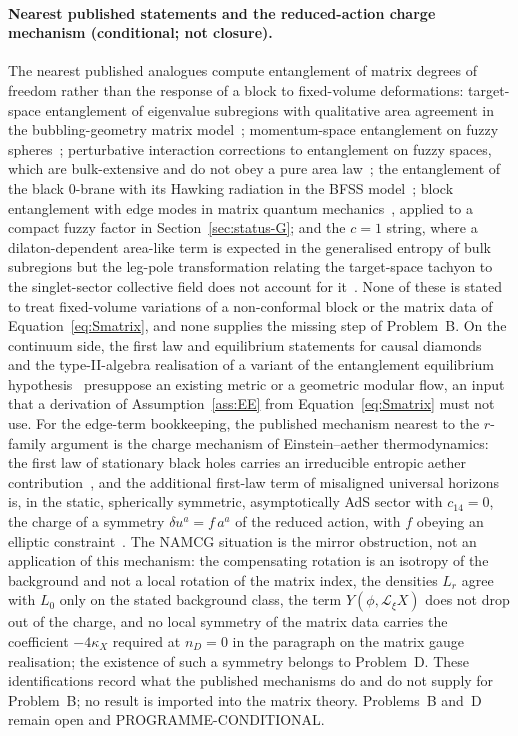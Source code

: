 \paragraph{Nearest published statements and the reduced-action charge mechanism (conditional; not closure).}
The nearest published analogues compute entanglement of matrix degrees of freedom rather than the response of a block to fixed-volume deformations: target-space entanglement of eigenvalue subregions with qualitative area agreement in the bubbling-geometry matrix model~\cite{TsuchiyaYamashiro2022}; momentum-space entanglement on fuzzy spheres~\cite{KawamotoKuroki2021}; perturbative interaction corrections to entanglement on fuzzy spaces, which are bulk-extensive and do not obey a pure area law~\cite{AlloucheDou2026}; the entanglement of the black 0-brane with its Hawking radiation in the BFSS model~\cite{ChoudhuryLaurenzano2024}; block entanglement with edge modes in matrix quantum mechanics~\cite{FlissFrenkelHartnollSoni2025,Frenkel2023EdgeModes}, applied to a compact fuzzy factor in Section~\ref{sec:status-G}; and the \(c=1\) string, where a dilaton-dependent area-like term is expected in the generalised entropy of bulk subregions but the leg-pole transformation relating the target-space tachyon to the singlet-sector collective field does not account for it~\cite{Craps2026}. None of these is stated to treat fixed-volume variations of a non-conformal block or the matrix data of Equation~\eqref{eq:Smatrix}, and none supplies the missing step of Problem~B. On the continuum side, the first law and equilibrium statements for causal diamonds~\cite{JacobsonVisser2019,Svesko2019} and the type-II-algebra realisation of a variant of the entanglement equilibrium hypothesis~\cite{JensenSorceSperanza2023} presuppose an existing metric or a geometric modular flow, an input that a derivation of Assumption~\ref{ass:EE} from Equation~\eqref{eq:Smatrix} must not use. For the edge-term bookkeeping, the published mechanism nearest to the \(r\)-family argument is the charge mechanism of Einstein--aether thermodynamics: the first law of stationary black holes carries an irreducible entropic aether contribution~\cite{ArataLiberatiNeri2026}, and the additional first-law term of misaligned universal horizons is, in the static, spherically symmetric, asymptotically AdS sector with \(c_{14}=0\), the charge of a symmetry \(\delta u^a=f\,a^a\) of the reduced action, with \(f\) obeying an elliptic constraint~\cite{ArataIsmailLiberati2026}. The NAMCG situation is the mirror obstruction, not an application of this mechanism: the compensating rotation is an isotropy of the background and not a local rotation of the matrix index, the densities \(L_r\) agree with \(L_0\) only on the stated background class, the term \(Y(\phi,\mathcal L_\xi X)\) does not drop out of the charge, and no local symmetry of the matrix data carries the coefficient \(-4\kappa_X\) required at \(n_D=0\) in the paragraph on the matrix gauge realisation; the existence of such a symmetry belongs to Problem~D. These identifications record what the published mechanisms do and do not supply for Problem~B; no result is imported into the matrix theory. Problems~B and~D remain open and PROGRAMME-CONDITIONAL.

